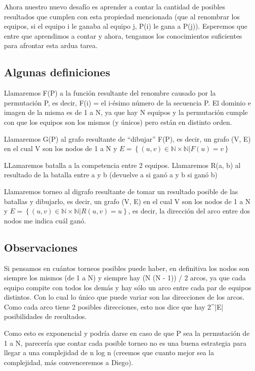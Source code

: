 Ahora nuestro nuevo desafío es aprender a contar la cantidad de posibles resultados que cumplen con esta propiedad mencionada (que al renombrar los equipos, si el equipo i le ganaba al equipo j, P(i) le gana a P(j)). Esperemos que entre que aprendimos a contar y ahora, tengamos los conocimientos suficientes para afrontar esta ardua tarea. \newline


\subsection{Algunas definiciones}

Llamaremos F(P) a la función resultante del renombre causado por la permutación P, es decir, F(i) = el i-ésimo número de la secuencia P. El dominio e imagen de la misma es de 1 a N, ya que hay N equipos y la permutación cumple con que los equipos son los mismos (y únicos) pero están en distinto orden. \newline

Llamaremos G(P) al grafo resultante de ``dibujar'' F(P), es decir, un grafo (V, E) en el cual V son los nodos de 1 a N y $E=\left\{ (u, v)\in\mathbb{N \times N}| F(u) = v \right\}$  \newline

LLamaremos batalla a la competencia entre 2 equipos. Llamaremos R(a, b) al resultado de la batalla entre a y b (devuelve a si ganó a y b si ganó b) \newline

Llamaremos torneo al digrafo resultante de tomar un resultado posible de las batallas y dibujarlo, es decir, un grafo (V, E) en el cual V son los nodos de 1 a N y $E=\left\{ (u, v)\in\mathbb{N \times N}| R(u, v) = u \right\}$, es decir, la dirección del arco entre dos nodos me indica cuál ganó.

\subsection{Observaciones}

Si pensamos en cuántos torneos posibles puede haber, en definitiva los nodos son siempre los mismos (de 1 a N) y siempre hay (N \times (N - 1)) / 2 arcos, ya que cada equipo compite con todos los demás y hay sólo un arco entre cada par de equipos distintos. Con lo cual lo único que puede variar son las direcciones de los arcos. Como cada arco tiene 2 posibles direcciones, esto nos dice que hay 2^|E| posibilidades de resultados.

Como esto es exponencial y podría darse en caso de que P sea la permutación de 1 a N, parecería que contar cada posible torneo no es una buena estrategia para llegar a una complejidad de n log n (creemos que cuanto mejor sea la complejidad, más convenceremos a Diego).
